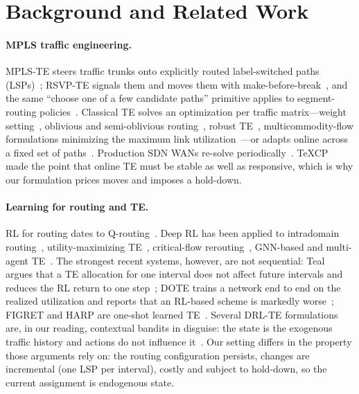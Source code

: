 \section{Background and Related Work}
\label{sec:related}

\paragraph{MPLS traffic engineering.}
MPLS-TE steers traffic trunks onto explicitly routed label-switched paths
(LSPs)~\citep{rfc2702,awduche1999mpls}; RSVP-TE signals them and moves them with
make-before-break~\citep{rfc3209}, and the same ``choose one of a few candidate
paths'' primitive applies to segment-routing policies~\citep{rfc8402}.
Classical TE solves an optimization per traffic matrix---weight
setting~\citep{fortz2000ospf}, oblivious and semi-oblivious
routing~\citep{applegate2003oblivious,kumar2018smore}, robust
TE~\citep{wang2006cope}, multicommodity-flow formulations minimizing the maximum
link utilization~\citep{wang2008overview}---or adapts online across a fixed set
of paths~\citep{elwalid2001mate,kandula2005texcp}. Production SDN WANs re-solve
periodically~\citep{jain2013b4,hong2013swan}. TeXCP~\citep{kandula2005texcp}
made the point that online TE must be stable as well as responsive, which is
why our formulation prices moves and imposes a hold-down.

\paragraph{Learning for routing and TE.}
RL for routing dates to Q-routing~\citep{boyan1993qrouting}. Deep RL has been
applied to intradomain routing~\citep{valadarsky2017learning,stampa2017drl},
utility-maximizing TE~\citep{xu2018drlte}, critical-flow
rerouting~\citep{zhang2020cfrrl,pei2024efficientte}, GNN-based and multi-agent
TE~\citep{almasan2022drlgnn,hope2021gddr,bernardez2021ml,bernardez2023magnneto,geng2020marlte,gui2024redte}.
The strongest recent systems, however, are not sequential: Teal argues that a
TE allocation for one interval does not affect future intervals and reduces
the RL return to one step~\citep{xu2023teal}; DOTE trains a network end to end
on the realized utilization and reports that an RL-based scheme is markedly
worse~\citep{perry2023dote}; FIGRET and HARP are one-shot learned
TE~\citep{liu2024figret,alqiam2024harp}. Several DRL-TE formulations are, in our
reading, contextual bandits in disguise: the state is the exogenous traffic
history and actions do not influence it~\citep{valadarsky2017learning,zhang2020cfrrl}.
Our setting differs in the property those arguments rely on: the routing
configuration persists, changes are incremental (one LSP per interval), costly
and subject to hold-down, so the current assignment is endogenous state.


